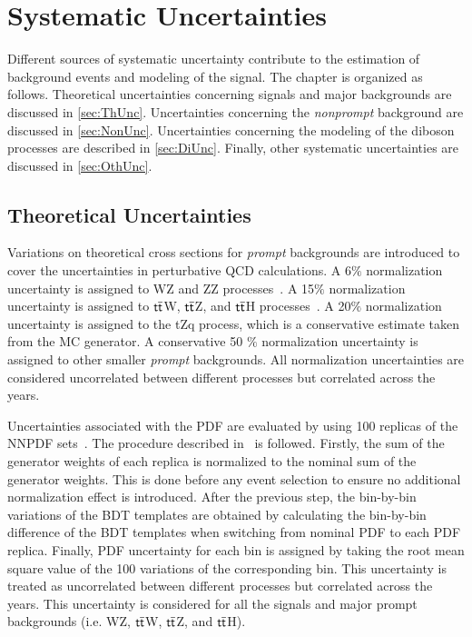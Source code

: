 \chapter{Systematic Uncertainties}
\label{chap:Systematics}

Different sources of systematic uncertainty contribute to the estimation of background events and modeling of the signal. The chapter is organized as follows. Theoretical uncertainties concerning signals and major backgrounds are discussed in \autoref{sec:ThUnc}. Uncertainties concerning the \emph{nonprompt} background are discussed in \autoref{sec:NonUnc}. Uncertainties concerning the modeling of the diboson processes are described in \autoref{sec:DiUnc}. Finally, other systematic uncertainties are discussed in \autoref{sec:OthUnc}.

\section{Theoretical Uncertainties}
\label{sec:ThUnc}

Variations on theoretical cross sections for \emph{prompt} backgrounds are introduced to cover the uncertainties in perturbative \ac{QCD} calculations. A 6$\%$ normalization uncertainty is assigned to WZ and ZZ processes~\cite{Campbell:2011bn}. A 15$\%$ normalization uncertainty is assigned to $\textsf{t}\overline{\textsf{t}}$W, $\textsf{t}\overline{\textsf{t}}$Z, and $\textsf{t}\overline{\textsf{t}}$H processes~\cite{Frederix:2021agh,Kulesza:2020nfh}. A 20$\%$ normalization uncertainty is assigned to the tZq process, which is a conservative estimate taken from the \ac{MC} generator. A conservative 50 $\%$ normalization uncertainty is assigned to other smaller \emph{prompt} backgrounds. All normalization uncertainties are considered uncorrelated between different processes but correlated across the years. 

Uncertainties associated with the \ac{PDF} are evaluated by using 100 replicas of the NNPDF sets~\cite{NNPDF:2014otw,NNPDF:2017mvq}. The procedure described in~\cite{CMS:2012nsv} is followed. Firstly, the sum of the generator weights of each replica is normalized to the nominal sum of the generator weights. This is done before any event selection to ensure no additional normalization effect is introduced. After the previous step, the bin-by-bin variations of the \ac{BDT} templates are obtained by calculating the bin-by-bin difference of the \ac{BDT} templates when switching from nominal \ac{PDF} to each \ac{PDF} replica. Finally, \ac{PDF} uncertainty for each bin is assigned by taking the root mean square value of the 100 variations of the corresponding bin. This uncertainty is treated as uncorrelated between different processes but correlated across the years. This uncertainty is considered for all the signals and major prompt backgrounds (i.e. WZ, $\textsf{t}\overline{\textsf{t}}$W, $\textsf{t}\overline{\textsf{t}}$Z, and $\textsf{t}\overline{\textsf{t}}$H).

